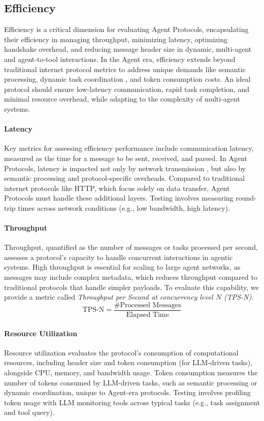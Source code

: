 \documentclass[10pt,preprint]{article}
\begin{document}
\subsection{Efficiency}
Efficiency is a critical dimension for evaluating Agent Protocols, encapsulating their efficiency in managing throughput, minimizing latency, optimizing handshake overhead, and reducing message header size in dynamic, multi-agent and agent-to-tool interactions. In the Agent era, efficiency extends beyond traditional internet protocol metrics to address unique demands like semantic processing, dynamic task coordination \citep{liu2022multi}, and token consumption costs. An ideal protocol should ensure low-latency communication, rapid task completion, and minimal resource overhead, while adapting to the complexity of multi-agent systems.

\paragraph{Latency} Key metrics for assessing efficiency performance include communication latency, measured as the time for a message to be sent, received, and parsed. In Agent Protocols, latency is impacted not only by network transmission \citep{jiang2018lowlatencynetworkinglatencylurks}, but also by semantic processing and protocol-specific overheads. Compared to traditional internet protocols like HTTP, which focus solely on data transfer, Agent Protocols must handle these additional layers. Testing involves measuring round-trip times across network conditions (e.g., low bandwidth, high latency). 

\paragraph{Throughput} Throughput, quantified as the number of messages or tasks processed per second, assesses a protocol’s capacity to handle concurrent interactions in agentic systems. High throughput is essential for scaling to large agent networks, as messages may include complex metadata, which reduces throughput compared to traditional protocols that handle simpler payloads. To evaluate this capability, we provide a metric called \textit{Throughput per Second at concurrency level $N$ (TPS-N)}.
\begin{equation}\label{equ:tps-n}
\text{TPS-N} = \frac{\# \text{Processed Messages}}{\text{Elapsed Time}}
\end{equation}

\paragraph{Resource Utilization} Resource utilization evaluates the protocol’s consumption of computational resources, including header size and token consumption (for LLM-driven tasks), alongside CPU, memory, and bandwidth usage. Token consumption measures the number of tokens consumed by LLM-driven tasks, such as semantic processing or dynamic coordination, unique to Agent-era protocols. Testing involves profiling token usage with LLM monitoring tools across typical tasks (e.g., task assignment and tool query). 
\end{document}
